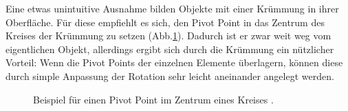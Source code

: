 \newpage
Eine etwas unintuitive Ausnahme bilden Objekte mit einer Krümmung in ihrer Oberfläche. Für diese empfiehlt es sich, den Pivot Point in das Zentrum des Kreises der Krümmung zu setzen (Abb.\ref{pivotRotation}). Dadurch ist er zwar weit weg vom eigentlichen Objekt, allerdings ergibt sich durch die Krümmung ein nützlicher Vorteil: Wenn die Pivot Points der einzelnen Elemente überlagern, können diese durch simple Anpassung der Rotation sehr leicht aneinander angelegt werden. \parencite{Mader}
\begin{figure}[H]
\centering
  \caption{Beispiel für einen Pivot Point im Zentrum eines Kreises \parencite{Mader}.}
	\label{pivotRotation}
\end{figure}
\vspace{-10.5pt}
